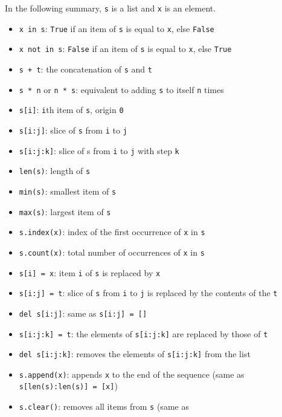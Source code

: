 \documentclass[12pt]{article} \newif\ifsolution\solutiontrue %
\begin{document}
In the following summary, \texttt{s} is a list and \texttt{x} is an
element.

\begin{itemize}
\item
  \texttt{x\ in\ s}: \texttt{True} if an item of \texttt{s} is equal to
  \texttt{x}, else \texttt{False}
\item
  \texttt{x\ not\ in\ s}: \texttt{False} if an item of \texttt{s} is
  equal to \texttt{x}, else \texttt{True}
\item
  \texttt{s\ +\ t}: the concatenation of \texttt{s} and \texttt{t}
\item
  \texttt{s\ *\ n} or \texttt{n\ *\ s}: equivalent to adding \texttt{s}
  to itself \texttt{n} times
\item
  \texttt{s{[}i{]}}: \texttt{i}th item of \texttt{s}, origin \texttt{0}
\item
  \texttt{s{[}i:j{]}}: slice of \texttt{s} from \texttt{i} to \texttt{j}
\item
  \texttt{s{[}i:j:k{]}}: slice of s from \texttt{i} to \texttt{j} with
  step \texttt{k}
\item
  \texttt{len(s)}: length of \texttt{s}
\item
  \texttt{min(s)}: smallest item of \texttt{s}
\item
  \texttt{max(s)}: largest item of \texttt{s}
\item
  \texttt{s.index(x)}: index of the first occurrence of \texttt{x} in
  \texttt{s}
\item
  \texttt{s.count(x)}: total number of occurrences of \texttt{x} in
  \texttt{s}
\item
  \texttt{s{[}i{]}\ =\ x}: item \texttt{i} of \texttt{s} is replaced by
  \texttt{x}
\item
  \texttt{s{[}i:j{]}\ =\ t}: slice of \texttt{s} from \texttt{i} to
  \texttt{j} is replaced by the contents of the \texttt{t}
\item
  \texttt{del\ s{[}i:j{]}}: same as \texttt{s{[}i:j{]}\ =\ {[}{]}}
\item
  \texttt{s{[}i:j:k{]}\ =\ t}: the elements of \texttt{s{[}i:j:k{]}} are
  replaced by those of \texttt{t}
\item
  \texttt{del\ s{[}i:j:k{]}}: removes the elements of
  \texttt{s{[}i:j:k{]}} from the list
\item
  \texttt{s.append(x)}: appends \texttt{x} to the end of the sequence
  (same as \texttt{s{[}len(s):len(s){]}\ =\ {[}x{]}})
\item
  \texttt{s.clear()}: removes all items from \texttt{s} (same as

\end{itemize}
\end{document}
